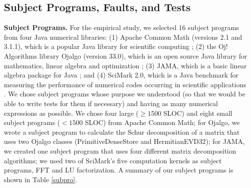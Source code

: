 \documentclass[times]{stvrauth}
\begin{document}
\subsection{Subject Programs, Faults, and Tests}
{\bf Subject Programs.}  For the empirical study, we selected 16 subject programs from four Java numerical libraries: (1) Apache Common Math (versions 2.1 and 3.1.1), which is a popular Java library for scientific computing \cite{Commons}; (2) the Oj! Algorithms library Ojalgo (version 33.0), which is an open source Java library for mathematics, linear algebra and optimization \cite{Oj}; (3) JAMA, which is a basic linear algebra package for Java \cite{JAMA}; and (4) SciMark 2.0, which is a Java benchmark for measuring the performance of numerical codes occurring in scientific applications \cite{SciMark}.  We chose subject programs whose purpose we understood (so that we would be able to write tests for them if necessary) and having as many numerical expressions as possible.  We chose four large ($\ge 1500$ SLOC) and eight small subject programs ($< 1500$ SLOC) from Apache Common Math; for Ojalgo, we wrote a subject program to calculate the Schur decomposition of a matrix that uses two Ojalgo classes (PrimitiveDenseStore and HermitianEVD32); for JAMA, we created one subject program that uses four different matrix decomposition algorithms; we used two of SciMark's five computation kernels as subject programs, FFT and LU factorization.  A summary of our subject programs is shown in Table \ref{subpro}.
\end{document}
